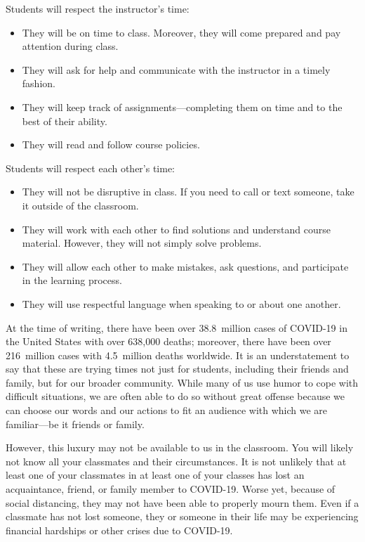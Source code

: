 \documentclass[11pt,letterpaper]{article}
\begin{document}
Students will respect the instructor's time:
	\begin{itemize}
	\item They will be on time to class. Moreover, they will come prepared and pay attention during class. 
	\item They will ask for help and communicate with the instructor in a timely fashion. 
	\item They will keep track of assignments---completing them on time and to the best of their ability.  
	\item They will read and follow course policies. 
	\end{itemize} \pspace

Students will respect each other's time:
	\begin{itemize}
	\item They will not be disruptive in class. If you need to call or text someone, take it outside of the classroom. 
	\item They will work with each other to find solutions and understand course material. However, they will not simply solve problems. 
	\item They will allow each other to make mistakes, ask questions, and participate in the learning process. 
	\item They will use respectful language when speaking to or about one another. 
	\end{itemize}
\sectionbreak



At the time of writing, there have been over 38.8~million cases of COVID-19 in the United States with over 638,000 deaths; moreover, there have been over 216~million cases with 4.5~million deaths worldwide. It is an understatement to say that these are trying times not just for students, including their friends and family, but for our broader community. While many of us use humor to cope with difficult situations, we are often able to do so without great offense because we can choose our words and our actions to fit an audience with which we are familiar---be it friends or family. \pspace

However, this luxury may not be available to us in the classroom. You will likely not know all your classmates and their circumstances. It is not unlikely that at least one of your classmates in at least one of your classes has lost an acquaintance, friend, or family member to COVID-19. Worse yet, because of social distancing, they may not have been able to properly mourn them. Even if a classmate has not lost someone, they or someone in their life may be experiencing financial hardships or other crises due to COVID-19. \pspace
\end{document}
